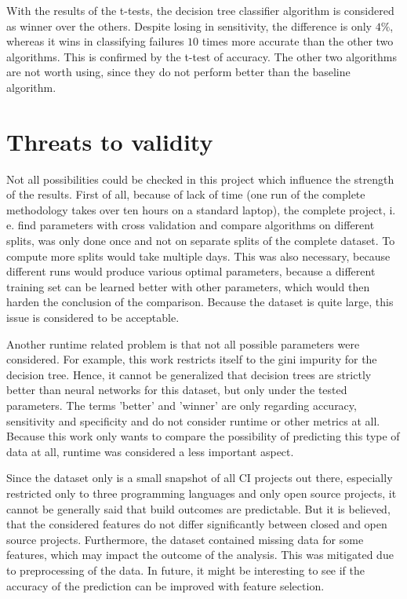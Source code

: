 \documentclass[a4paper,11pt]{article}
\begin{document}
With the results of the t-tests, the decision tree classifier algorithm is considered as winner over the others. Despite losing in sensitivity, the difference is only $4\%$, whereas it wins in classifying failures $10$ times more accurate than the other two algorithms. This is confirmed by the t-test of accuracy. The other two algorithms are not worth using, since they do not perform better than the baseline algorithm. 

\section{Threats to validity}

Not all possibilities could be checked in this project which influence the strength of the results. 
First of all, because of lack of time (one run of the complete methodology takes over ten hours on a standard laptop), the complete project, i. e. find parameters with cross validation and compare algorithms on different splits, was only done once and not on separate splits of the complete dataset. To compute more splits would take multiple days. This was also necessary, because different runs would produce various optimal parameters, because a different training set can be learned better with other parameters, which would then harden the conclusion of the comparison. Because the dataset is quite large, this issue is considered to be acceptable. 

Another runtime related problem is that not all possible parameters were considered. For example, this work restricts itself to the gini impurity for the decision tree. Hence, it cannot be generalized that decision trees are strictly better than neural networks for this dataset, but only under the tested parameters. The terms 'better' and 'winner' are only regarding accuracy, sensitivity and specificity and do not consider runtime or other metrics at all. Because this work only wants to compare the possibility of predicting this type of data at all, runtime was considered a less important aspect. 

Since the dataset only is a small snapshot of all CI projects out there, especially restricted only to three programming languages and only open source projects, it cannot be generally said that build outcomes are predictable. But it is believed, that the considered features do not differ significantly between closed and open source projects. Furthermore, the dataset contained missing data for some features, which may impact the outcome of the analysis. This was mitigated due to preprocessing of the data. In future, it might be interesting to see if the accuracy of the prediction can be improved with feature selection. 
\end{document}

